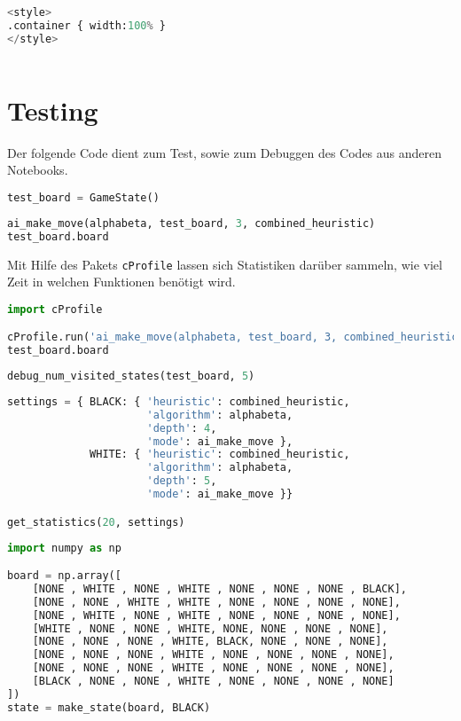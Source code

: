 \begin{lstlisting}[language=Python]
%%HTML
<style>
.container { width:100% }
</style>
\end{lstlisting}

\begin{lstlisting}[language=Python]
%run othello_test_util.ipynb
\end{lstlisting}

\hypertarget{testing}{%
\section{Testing}\label{testing}}

Der folgende Code dient zum Test, sowie zum Debuggen des Codes aus
anderen Notebooks.

\begin{lstlisting}[language=Python]
test_board = GameState()
\end{lstlisting}

\begin{lstlisting}[language=Python]
ai_make_move(alphabeta, test_board, 3, combined_heuristic)
test_board.board
\end{lstlisting}

Mit Hilfe des Pakets \passthrough{\lstinline!cProfile!} lassen sich
Statistiken darüber sammeln, wie viel Zeit in welchen Funktionen
benötigt wird.

\begin{lstlisting}[language=Python]
import cProfile

cProfile.run('ai_make_move(alphabeta, test_board, 3, combined_heuristic)')
test_board.board
\end{lstlisting}

\begin{lstlisting}[language=Python]
debug_num_visited_states(test_board, 5)
\end{lstlisting}

\begin{lstlisting}[language=Python]
settings = { BLACK: { 'heuristic': combined_heuristic,
                      'algorithm': alphabeta,
                      'depth': 4,
                      'mode': ai_make_move },
             WHITE: { 'heuristic': combined_heuristic,
                      'algorithm': alphabeta,
                      'depth': 5,
                      'mode': ai_make_move }}

get_statistics(20, settings)
\end{lstlisting}

\begin{lstlisting}[language=Python]
import numpy as np

board = np.array([
    [NONE , WHITE , NONE , WHITE , NONE , NONE , NONE , BLACK],
    [NONE , NONE , WHITE , WHITE , NONE , NONE , NONE , NONE],
    [NONE , WHITE , NONE , WHITE , NONE , NONE , NONE , NONE],
    [WHITE , NONE , NONE , WHITE, NONE, NONE , NONE , NONE],
    [NONE , NONE , NONE , WHITE, BLACK, NONE , NONE , NONE],
    [NONE , NONE , NONE , WHITE , NONE , NONE , NONE , NONE],
    [NONE , NONE , NONE , WHITE , NONE , NONE , NONE , NONE],
    [BLACK , NONE , NONE , WHITE , NONE , NONE , NONE , NONE]
])
state = make_state(board, BLACK)
\end{lstlisting}

